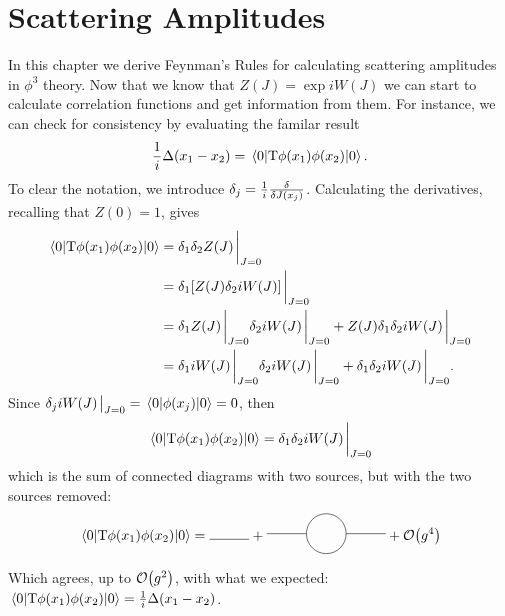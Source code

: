 \chapter{Scattering Amplitudes}
In this chapter we derive Feynman's Rules for calculating scattering amplitudes in $\phi^3$ theory. Now that we know that $Z(J)=\exp i W(J)$ we can start to calculate correlation functions and get information from them. For instance, we can check for consistency by evaluating the familar result
\begin{equation}
    \frac{1}{i}\Delta(x_1-x_2)=\vev{\text{T}\phi(x_1)\phi(x_2)}.
\end{equation}
To clear the notation, we introduce $\delta_j=\frac{1}{i}\fdv{J(x_j)}$. Calculating the derivatives, recalling that $Z(0)=1$, gives
\begin{equation}
\begin{aligned}
     \vev{\text{T}\phi(x_1)\phi(x_2)}&= \delta_1\delta_2Z(J)\eval_{J=0}\\
     &=\delta_1[Z(J)\delta_2iW(J)]\eval_{J=0}\\
     &=\delta_1Z(J)\eval_{J=0}\delta_2 iW(J)\eval_{J=0}+Z(J)\delta_1\delta_2iW(J)\eval_{J=0}\\
     &=\delta_1iW(J)\eval_{J=0}\delta_2 iW(J)\eval_{J=0} + \delta_1\delta_2iW(J)\eval_{J=0}.
\end{aligned}
\end{equation}
Since $\delta_jiW(J)\eval_{J=0}=\vev{\phi(x_j)}=0$, then
\begin{equation}
    \vev{\text{T}\phi(x_1)\phi(x_2)}=\delta_1\delta_2iW(J)\eval_{J=0}
\end{equation}
which is the sum of connected diagrams with two sources, but with the two sources removed:
\begin{equation}
    \vev{\text{T}\phi(x_1)\phi(x_2)}=
    \begin{gathered}
       \begin{tikzpicture}
     \draw (0,0) -- (1,0.0);
    \end{tikzpicture}
    \end{gathered}
    +
     \begin{gathered}
       \begin{tikzpicture}
     \draw (0,0) -- (1,0);
     \draw (1.5,0) circle(0.5);
     \draw (2,0) -- (3,0);
    \end{tikzpicture}
    \end{gathered}
    +\order{g^4}
    \label{nao_conectados}
\end{equation}
Which agrees, up to $\order{g^2}$, with what we expected: $\vev{\text{T}\phi(x_1)\phi(x_2)}=\frac{1}{i}\Delta(x_1-x_2)$.\\

